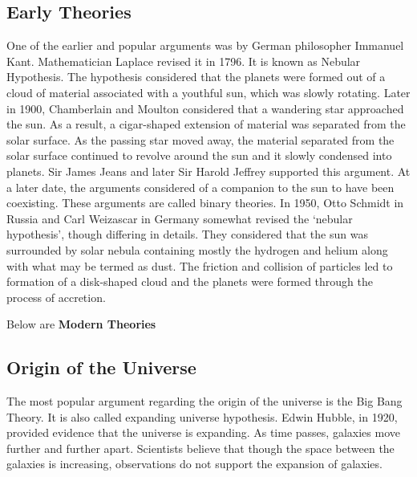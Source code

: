 \documentclass[8pt, a4paper, oneside, twocolumn]{extarticle}
\begin{document}
\subsection{Early Theories}
One of the earlier and popular arguments was by German philosopher Immanuel Kant. Mathematician Laplace revised it in 1796. It is known as Nebular Hypothesis. The hypothesis considered that the planets were formed out of a cloud of material associated with a youthful sun, which was slowly rotating. Later in 1900, Chamberlain and Moulton considered that a wandering star approached the sun. As a result, a cigar-shaped extension of material was separated from the solar surface. As the passing star moved away, the material separated from the solar surface continued to revolve around the sun and it slowly condensed into planets. Sir James Jeans and later Sir Harold Jeffrey supported this argument. At a later date, the arguments considered of a companion to the sun to have been coexisting. These arguments are called binary theories. In 1950, Otto Schmidt in Russia and Carl Weizascar in Germany somewhat revised the ‘nebular hypothesis’, though differing in details. They considered that the sun was surrounded by solar nebula containing mostly the hydrogen and helium along with what may be termed as dust. The friction and collision of particles led to formation of a disk-shaped cloud and the planets were formed through the process of accretion.

Below are \textbf{Modern Theories}

\subsection{Origin of the Universe}

The most popular argument regarding the origin
of the universe is the Big Bang Theory. It is also called expanding universe hypothesis. Edwin Hubble, in 1920, provided evidence that the universe is expanding. As time passes, galaxies move further and further apart. Scientists believe that though the space between the galaxies is increasing, observations do not support the expansion of galaxies.
\end{document}
